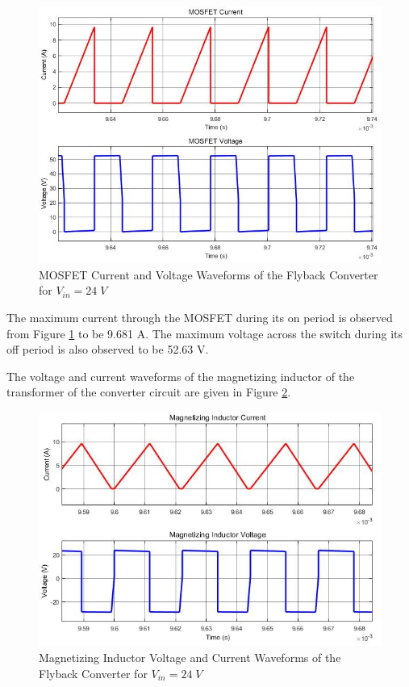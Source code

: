 \begin{figure}[H]
\begin{center}
\includegraphics[width=1\textwidth]{MOSFET_curr_volt_24.jpg}
\caption{MOSFET Current and Voltage Waveforms of the Flyback Converter for $ V_{in} = 24\;V $}
\label{fig:mos24}
\end{center}
\end{figure}

The maximum current through the MOSFET during its on period is observed from Figure \ref{fig:mos24} to be 9.681 A. The maximum voltage across the switch during its off period is also observed to be 52.63 V.

The voltage and current waveforms of the magnetizing inductor of the transformer of the converter circuit are given in Figure \ref{fig:ind24}.

\begin{figure}[H]
\begin{center}
\includegraphics[width=1\textwidth]{inductor_volt_curr_24.jpg}
\caption{Magnetizing Inductor Voltage and Current Waveforms of the Flyback Converter for $ V_{in} = 24\;V $}
\label{fig:ind24}
\end{center}
\end{figure}

